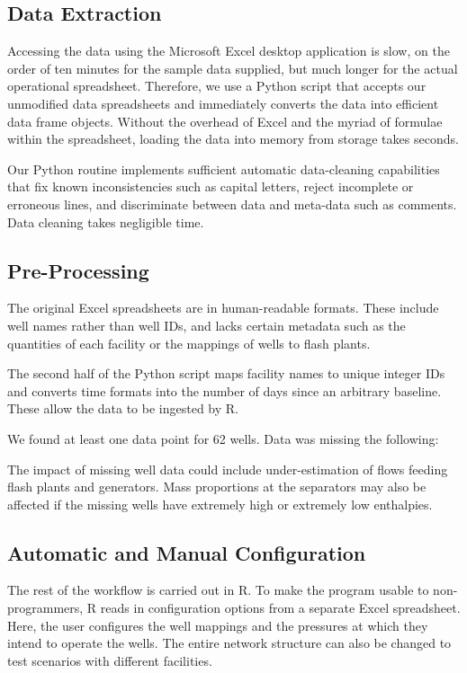 \documentclass[a4paper, 12pt]{article}
\begin{document}
\subsection{Data Extraction}
Accessing the data using the Microsoft Excel desktop application is slow, on the order of ten minutes for the sample data supplied, but much longer for the actual operational spreadsheet. Therefore, we use a Python script that accepts our unmodified data spreadsheets and immediately converts the data into efficient data frame objects. Without the overhead of Excel and the myriad of formulae within the spreadsheet, loading the data into memory from storage takes seconds.

Our Python routine implements sufficient automatic data-cleaning capabilities that fix known inconsistencies such as capital letters, reject incomplete or erroneous lines, and discriminate between data and meta-data such as comments. Data cleaning takes negligible time.

\subsection{Pre-Processing}
The original Excel spreadsheets are in human-readable formats. These include well names rather than well IDs, and lacks certain metadata such as the quantities of each facility or the mappings of wells to flash plants.

The second half of the Python script maps facility names to unique integer IDs and converts time formats into the number of days since an arbitrary baseline. These allow the data to be ingested by R.

We found at least one data point for 62 wells. Data was missing the following:


The impact of missing well data could include under-estimation of flows feeding flash plants and generators. Mass proportions at the separators may also be affected if the missing wells have extremely high or extremely low enthalpies.

\subsection{Automatic and Manual Configuration}
The rest of the workflow is carried out in R. To make the program usable to non-programmers, R reads in configuration options from a separate Excel spreadsheet. Here, the user configures the well mappings and the pressures at which they intend to operate the wells. The entire network structure can also be changed to test scenarios with different facilities.
\end{document}
